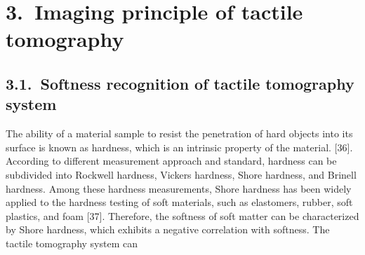 \documentclass[11pt]{article}
\begin{document}
\section*{3.\ Imaging principle of tactile tomography}

\subsection*{3.1.\ Softness recognition of tactile tomography system}

The ability of a material sample to resist the penetration of hard
objects into its surface is known as hardness, which is an intrinsic
property of the material. [36]. According to different measurement
approach and standard, hardness can be subdivided into Rockwell
hardness, Vickers hardness, Shore hardness, and Brinell hardness.
Among these hardness measurements, Shore hardness has been widely
applied to the hardness testing of soft materials, such as
elastomers, rubber, soft plastics, and foam [37]. Therefore, the
softness of soft matter can be characterized by Shore hardness,
which exhibits a negative correlation with softness. The tactile
tomography system can
\end{document}
